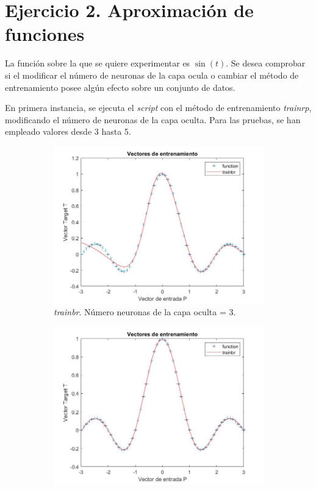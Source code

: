 \documentclass{article}
\begin{document}
\section{Ejercicio 2. Aproximación de funciones}

La función sobre la que se quiere experimentar es $\sin(t)$. Se desea comprobar
si el modificar el número de neuronas de la capa ocula o cambiar el método de
entrenamiento posee algún efecto sobre un conjunto de datos.

En primera instancia, se ejecuta el \textit{script} con el método de
entrenamiento \textit{trainrp}, modificando el número de neuronas de la capa
oculta. Para las pruebas, se han empleado valores desde 3 hasta 5.

\begin{figure}[H]
 \centering
 \begin{subfigure}{0.3\textwidth}
  \includegraphics[width=0.8\linewidth]{../images/I_ex2_trainbr_3.jpg}
  \caption{\textit{trainbr}. Número neuronas de la capa oculta = 3.}
 \end{subfigure}
 \begin{subfigure}{0.3\textwidth}
  \includegraphics[width=0.8\linewidth]{../images/I_ex2_trainbr_4.jpg}

\end{subfigure}
\end{figure}
\end{document}
